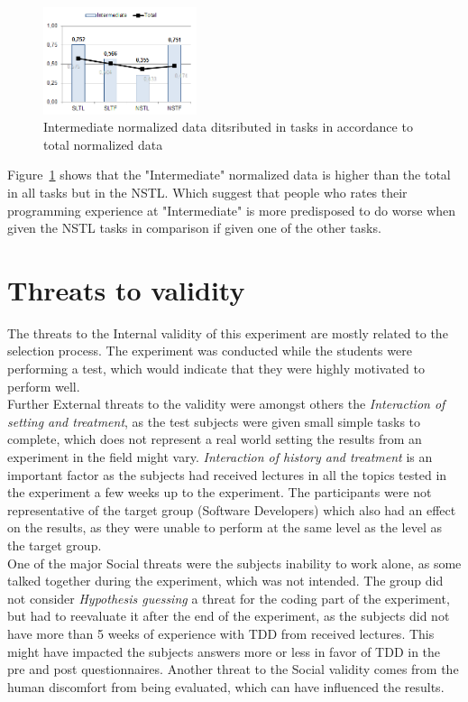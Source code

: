 \documentclass{sig-alternate-05-2015}
\begin{document}
\begin{figure}[H]
	\centering
	\includegraphics[width=0.4\textwidth]{img12}
	\caption{Intermediate normalized data ditsributed in tasks in accordance to total normalized data}
	\label{fig:Intermediate normalized data ditsributed in tasks in accordance to total normalized data}
\end{figure}

Figure~\ref{fig:Intermediate normalized data ditsributed in tasks in accordance to total normalized data} shows that the "Intermediate" normalized data is higher than the total in all tasks but in the NSTL. Which suggest that people who rates their programming experience at "Intermediate" is more predisposed to do worse when given the NSTL tasks in comparison if given one of the other tasks.

\section{Threats to validity}

The threats to the Internal validity of this experiment are mostly related to the selection process. The experiment was conducted while the students were performing a test, which would indicate that they were highly motivated to perform well.\\

Further External threats to the validity were amongst others the \textit{Interaction of setting and treatment}, as the test subjects were given small simple tasks to complete, which does not represent a real world setting the results from an experiment in the field might vary. \textit{Interaction of history and treatment} is an important factor as the subjects had received lectures in all the topics tested in the experiment a few weeks up to the experiment. The participants were not representative of the target group (Software Developers) which also had an effect on the results, as they were unable to perform at the same level as the level as the target group.\\

One of the major Social threats were the subjects inability to work alone, as some talked together during the experiment, which was not intended. The group did not consider \textit{Hypothesis guessing} a threat for the coding part of the experiment, but had to reevaluate it after the end of the experiment, as the subjects did not have more than 5  weeks of experience with TDD from received lectures. This might have impacted the subjects answers more or less in favor of TDD in the pre and post questionnaires. Another threat to the Social validity comes from the human discomfort from being evaluated, which can have influenced the results.\\
\end{document}
